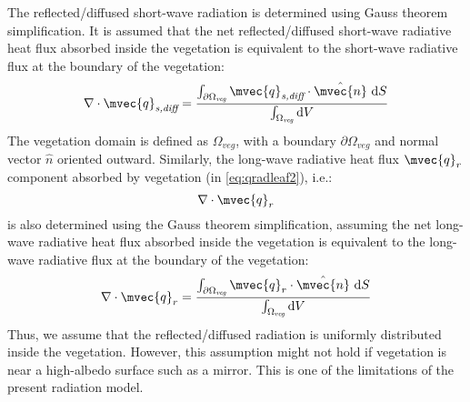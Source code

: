 The reflected/diffused short-wave radiation is determined using Gauss theorem simplification. It is assumed that the net reflected/diffused short-wave radiative heat flux absorbed inside the vegetation is equivalent to the short-wave radiative flux at the boundary of the vegetation: 
\begin{equation}
\nabla \cdot \mvec{q}_{\textit{s,diff}} = \frac{\int_{\partial \Omega_{\textit{veg}}} \mvec{q}_{\textit{s,diff}} \cdot \hat{\mvec{n}}~\mathrm{d}S}{\int_{\Omega_{\textit{veg}}}\mathrm{d}V}
\label{eq:qssw12}
\end{equation}
The vegetation domain is defined as $\Omega_{\textit{veg}}$, with a boundary $\partial \Omega_{\textit{veg}}$ and normal vector $\hat{n}$ oriented outward. Similarly, the long-wave radiative heat flux $\mvec{q}_r$ component absorbed by vegetation (in \cref{eq:qradleaf2}), i.e.:
\begin{equation}
\nabla \cdot \mvec{q}_r 
\end{equation}
is also determined using the Gauss theorem simplification, assuming the net long-wave radiative heat flux absorbed inside the vegetation is equivalent to the long-wave radiative flux at the boundary of the vegetation: 
\begin{equation}
\nabla \cdot \mvec{q}_r = \frac{\int_{\partial \Omega_{\textit{veg}}} \mvec{q}_r \cdot \hat{\mvec{n}}~\mathrm{d}S}{\int_{\Omega_{\textit{veg}}}\mathrm{d}V}
\label{eq:qrlw12}
\end{equation}
Thus, we assume that the reflected/diffused radiation is uniformly distributed inside the vegetation. However, this assumption might not hold if vegetation is near a high-albedo surface such as a mirror. This is one of the limitations of the present radiation model.

